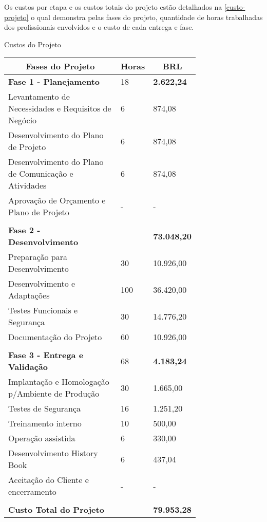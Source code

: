 Os custos por etapa e os custos totais do projeto estão detalhados na \autoref{custo-projeto} o qual demonstra pelas fases do projeto, quantidade de horas trabalhadas dos profissionais envolvidos e o custo de cada entrega e fase.

\begin{enumerate}
    \begin{quadro}[H]
    \caption{Custos do Projeto}
    \label{custo-projeto}
    	\centering\footnotesize
        \begin{tabular}{|p{0.60\linewidth} | p{0.04\linewidth} | p{0.10\linewidth} | }  \hline
        \multicolumn{1}{|c|}{\textbf{Fases do Projeto}} &
        \multicolumn{1}{c|}{\textbf{Horas}} &
        \multicolumn{1}{c|}{\textbf{BRL}} \\ \hline
          
        {\textbf{Fase 1 - Planejamento}}    & 18 &  {\textbf{2.622,24}}               \\  \hline
        Levantamento de Necessidades  e Requisitos de Negócio & 6 & 874,08             \\ \hline
        Desenvolvimento do Plano de Projeto & 6 & 874,08           \\ \hline
        Desenvolvimento do Plano de Comunicação e Atividades & 6 & 874,08              \\ \hline
        Aprovação de Orçamento e Plano de Projeto &  - &  -                              \\\hline
            & &   \\ \hline
        {\textbf{Fase 2 - Desenvolvimento}} & & {\textbf{73.048,20}} \\ \hline
        Preparação para Desenvolvimento & 30 & 10.926,00   \\ \hline
        Desenvolvimento e Adaptações & 100 & 36.420,00   \\ \hline
        Testes Funcionais e Segurança & 30 & 14.776,20  \\ \hline
        Documentação do Projeto & 60 & 10.926,00   \\ \hline
             & &  \\ \hline
        {\textbf{Fase 3 - Entrega e Validação}} & 68 & {\textbf{4.183,24}}  \\ \hline
        Implantação e Homologação p/Ambiente de Produção & 30 & 1.665,00\\ \hline
        Testes de Segurança & 16 & 1.251,20\\ \hline
        Treinamento interno & 10& 500,00\\ \hline
        Operação assistida & 6 & 330,00\\ \hline
        Desenvolvimento History Book & 6 & 437,04\\ \hline
        Aceitação do Cliente e encerramento & - & -\\ \hline
        & & \\ \hline
        {\textbf{Custo Total do Projeto}} &  & {\textbf{79.953,28}}\\ \hline        
        \end{tabular}
    \end{quadro}
\end{enumerate}